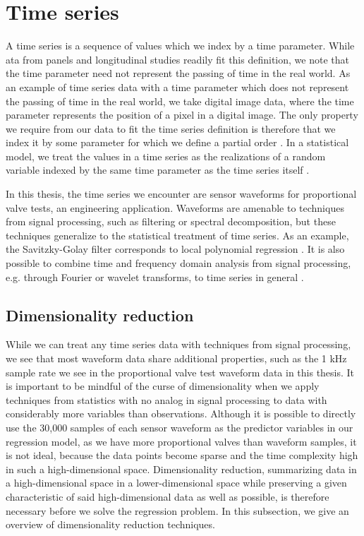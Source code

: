 \section{Time series}

A time series is a sequence of values which we index by a time parameter.
While ata from panels and longitudinal studies readily fit this definition, we note that the time parameter need not represent the passing of time in the real world.
As an example of time series data with a time parameter which does not represent the passing of time in the real world, we take digital image data, where the time parameter represents the position of a pixel in a digital image.
The only property we require from our data to fit the time series definition is therefore that we index it by some parameter for which we define a partial order \citep{davey2002introduction}.
In a statistical model, we treat the values in a time series as the realizations of a random variable indexed by the same time parameter as the time series itself \citep{shumway2000time}.

In this thesis, the time series we encounter are sensor waveforms for proportional valve tests, an engineering application.
Waveforms are amenable to techniques from signal processing, such as filtering or spectral decomposition, but these techniques generalize to the statistical treatment of time series.
As an example, the Savitzky-Golay filter \citep{savitzky1964smoothing} corresponds to local polynomial regression \citep{cleveland1979robust}.
It is also possible to combine time and frequency domain analysis from signal processing, e.g. through Fourier or wavelet transforms, to time series in general \citep{shumway2000time}.

\subsection{Dimensionality reduction}

While we can treat any time series data with techniques from signal processing, we see that most waveform data share additional properties, such as the 1 kHz sample rate we see in the proportional valve test waveform data in this thesis.
It is important to be mindful of the curse of dimensionality \citep{hastie2009elements} when we apply techniques from statistics with no analog in signal processing to data with considerably more variables than observations.
Although it is possible to directly use the 30,000 samples of each sensor waveform as the predictor variables in our regression model, as we have more proportional valves than waveform samples, it is not ideal, because the data points become sparse and the time complexity high in such a high-dimensional space.
Dimensionality reduction, summarizing data in a high-dimensional space in a lower-dimensional space while preserving a given characteristic of said high-dimensional data as well as possible, is therefore necessary before we solve the regression problem.
In this subsection, we give an overview of dimensionality reduction techniques.

